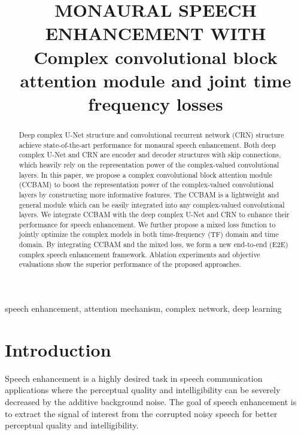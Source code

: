 \documentclass{article}
\title{MONAURAL SPEECH ENHANCEMENT WITH Complex convolutional block attention module and joint time frequency losses}
\begin{document}
\maketitle
\begin{abstract}
Deep complex U-Net structure and convolutional recurrent network (CRN) structure achieve state-of-the-art performance for monaural speech enhancement. Both deep complex U-Net and CRN are encoder and decoder structures with skip connections, which heavily rely on the representation power of the complex-valued convolutional layers. In this paper, we propose a complex convolutional block attention module (CCBAM) to boost the representation power of the complex-valued convolutional layers by constructing more informative features. The CCBAM is a lightweight and general module which can be easily integrated into any complex-valued convolutional layers. We integrate CCBAM with the deep complex U-Net and CRN to enhance their performance for speech enhancement. We further propose a mixed loss function to jointly optimize the complex models in both time-frequency (TF) domain and time domain. By integrating CCBAM and the mixed loss, we form a new end-to-end (E2E) complex speech enhancement framework. Ablation experiments and objective evaluations show the superior performance of the proposed approaches.
\end{abstract}
\begin{keywords}
speech enhancement, attention mechanism, complex network, deep learning
\end{keywords}
\section{Introduction}
\label{sec:intro}

Speech enhancement is a highly desired task in speech communication applications where the perceptual quality and intelligibility can be severely decreased by the additive background noise. The goal of speech enhancement is to extract the signal of interest from the corrupted noisy speech for better perceptual quality and intelligibility.
\end{document}
